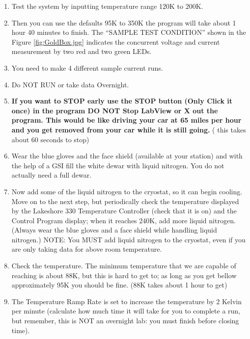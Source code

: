 \documentclass{../lab}
\begin{document}
\begin{enumerate}
    \item Test the system by inputting temperature range 120K to 200K.
    

    \item Then you can use the defaults 95K to 350K the program will take about 1 hour 40 minutes to finish. The ``SAMPLE TEST CONDITION'' shown in the Figure \ref{fig:GoldBox.jpg} indicates the concurrent voltage and current measurement by two red and two green LEDs.

    \item You need to make 4 different sample current runs.

    \item Do NOT RUN or take data Overnight.

    \item \textbf{If you want to STOP early use the STOP button (Only Click it once) in the program DO NOT Stop LabView or X out the program. This would be like driving your car at 65 miles per hour and you get removed from your car while it is still going.} ( this takes about 60 seconds to stop)

    \item Wear the blue gloves and the face shield (available at your station) and with the help of a GSI fill the white dewar with liquid nitrogen. You do not actually need a full dewar.

    \item Now add some of the liquid nitrogen to the cryostat, so it can begin cooling. Move on to the next step, but periodically check the temperature displayed by the Lakeshore 330 Temperature Controller (check that it is on) and the Control Program display; when it reaches 240K, add more liquid nitrogen.(Always wear the blue gloves and a face shield while handling liquid nitrogen.) NOTE: You MUST add liquid nitrogen to the cryostat, even if you are only taking data for above room temperature.

    \item Check the temperature. The minimum temperature that we are capable of reaching is about 88K, but this is hard to get to; as long as you get bellow approximately 95K you should be fine. (88K takes about 1 hour to get)

    \item The Temperature Ramp Rate is set to increase the temperature by 2 Kelvin per minute (calculate how much time it will take for you to complete a run,  but remember, this is NOT an overnight lab: you must finish before closing time).


\end{enumerate}
\end{document}
